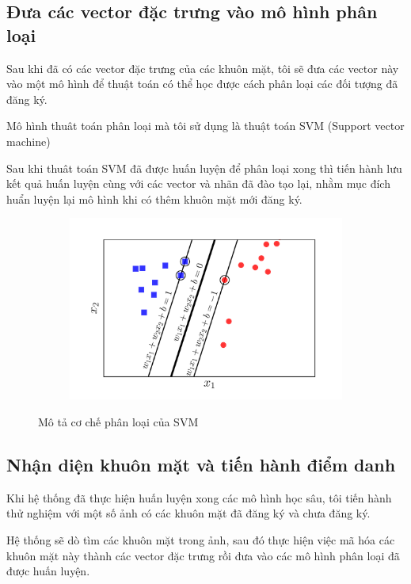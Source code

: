 \newpage
\subsection{Đưa các vector đặc trưng vào mô hình phân loại}
Sau khi đã có các vector đặc trưng của các khuôn mặt, tôi sẽ đưa các vector này
vào một mô hình để thuật toán có thể học được cách phân loại các đối tượng đã đăng ký.

Mô hình thuât toán phân loại mà tôi sử dụng là thuật toán SVM (Support vector machine)

Sau khi thuât toán SVM đã được huấn luyện để phân loại xong thì tiến hành lưu kết quả huấn luyện cùng
với các vector và nhãn đã đào tạo lại, nhằm mục đích huẩn luyện lại mô hình khi có thêm khuôn mặt mới
đăng ký.

\begin{figure}
    \begin{subfigure}{1\textwidth}
        \includegraphics[width=1\linewidth]{Chapters/items/svm3.jpg}
        \label{fig:svm}
    \end{subfigure}
    \caption{Mô tả cơ chế phân loại của SVM}
\end{figure}


\subsection{Nhận diện khuôn mặt và tiến hành điểm danh}
Khi hệ thống đã thực hiện huấn luyện xong các mô hình học sâu, tôi tiến hành thử nghiệm với một số ảnh có các khuôn mặt đã
đăng ký và chưa đăng ký.

Hệ thống sẽ dò tìm các khuôn mặt trong ảnh, sau đó thực hiện việc mã hóa các khuôn mặt này thành các vector đặc trưng
rồi đưa vào các mô hình phân loại đã được huấn luyện.

